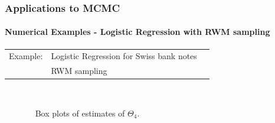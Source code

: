 \documentclass[xcolor=dvipsnames, subsection=false]{beamer}
\def\alertb#1{\alert{\color{BrickRed}  #1}}
\def\alertb#1{\alert{\color{BrickRed}  #1}}
\def\transpose{{\hbox{\it\tiny T}}}
\newcommand{\field}[1]{\mathbb{#1}}
\def\Re{\field{R}}
\newcommand{\pr}{\rho}
\begin{document}

\begin{frame}
\frametitle{Applications to MCMC}
\framesubtitle{Numerical Examples - Logistic Regression with RWM sampling}
\begin{tabular}{lll}\alertb{Example:}   & Logistic Regression for Swiss bank notes
	\\ & RWM sampling
\end{tabular}\\[-1.5em]
\begin{figure}
\centering
\mbox{
}
	Box plots of estimates of $\Theta_4$.
\end{figure}
\end{frame}
\end{document}
